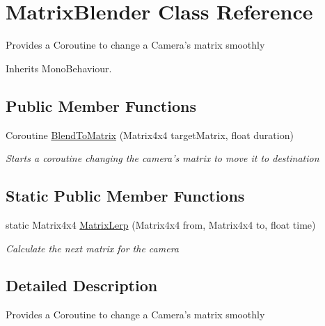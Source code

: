 \hypertarget{class_matrix_blender}{\section{Matrix\-Blender Class Reference}
\label{class_matrix_blender}
}


Provides a Coroutine to change a Camera's matrix smoothly  




Inherits Mono\-Behaviour.

\subsection*{Public Member Functions}
\begin{DoxyCompactItemize}
\item 
Coroutine \hyperlink{class_matrix_blender_a7c627113d44005629981b2503c36c9d7}{Blend\-To\-Matrix} (Matrix4x4 target\-Matrix, float duration)
\begin{DoxyCompactList}\small\item\em Starts a coroutine changing the camera's matrix to move it to destination \end{DoxyCompactList}\end{DoxyCompactItemize}
\subsection*{Static Public Member Functions}
\begin{DoxyCompactItemize}
\item 
static Matrix4x4 \hyperlink{class_matrix_blender_a78b84eeed383e15ebf58376e8c764332}{Matrix\-Lerp} (Matrix4x4 from, Matrix4x4 to, float time)
\begin{DoxyCompactList}\small\item\em Calculate the next matrix for the camera \end{DoxyCompactList}\end{DoxyCompactItemize}


\subsection{Detailed Description}
Provides a Coroutine to change a Camera's matrix smoothly 




